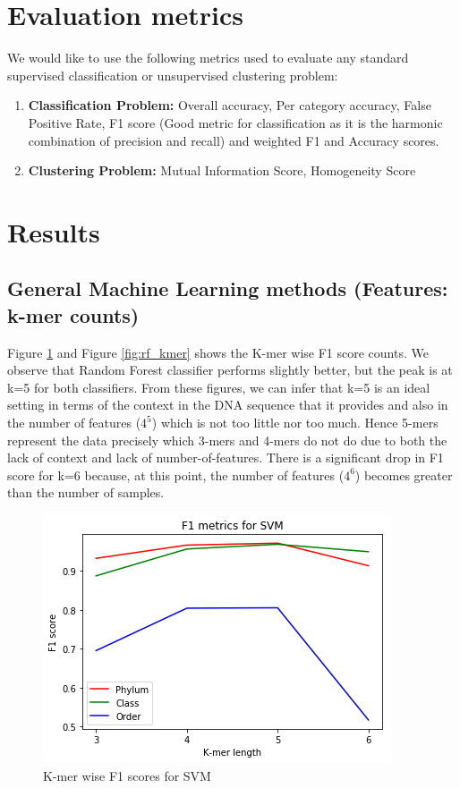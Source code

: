 \documentclass[12pt]{article}
\begin{document}
\section{Evaluation metrics}
We would like to use the following metrics used to evaluate any standard supervised classification or unsupervised clustering problem:
\begin{enumerate}
    \item \textbf{Classification Problem:} Overall accuracy, Per category accuracy, False Positive Rate, F1 score (Good metric for classification as it is the harmonic combination of precision and recall) and weighted F1 and Accuracy scores.
    \item \textbf{Clustering Problem:} Mutual Information Score, Homogeneity Score
\end{enumerate}

\section{Results}
        \subsection{General Machine Learning methods (Features: k-mer counts)}
        Figure \ref{fig:svm_kmer} and Figure \ref{fig:rf_kmer} shows the K-mer wise F1 score counts. We observe that Random Forest classifier performs slightly better, but the peak is at k=5 for both classifiers. From these figures, we can infer that k=5 is an ideal setting in terms of the context in the DNA sequence that it provides and also in the number of features ($4^5$) which is not too little nor too much. Hence 5-mers represent the data precisely which 3-mers and 4-mers do not do due to both the lack of context and lack of number-of-features. There is a significant drop in F1 score for k=6 because, at this point, the number of features ($4^6$) becomes greater than the number of samples.

        \begin{figure}[h]
        \centering
        \includegraphics[scale=0.5]{svm_kmer}
        \caption{K-mer wise F1 scores for SVM}
        \label{fig:svm_kmer}
        \end{figure}
\end{document}
